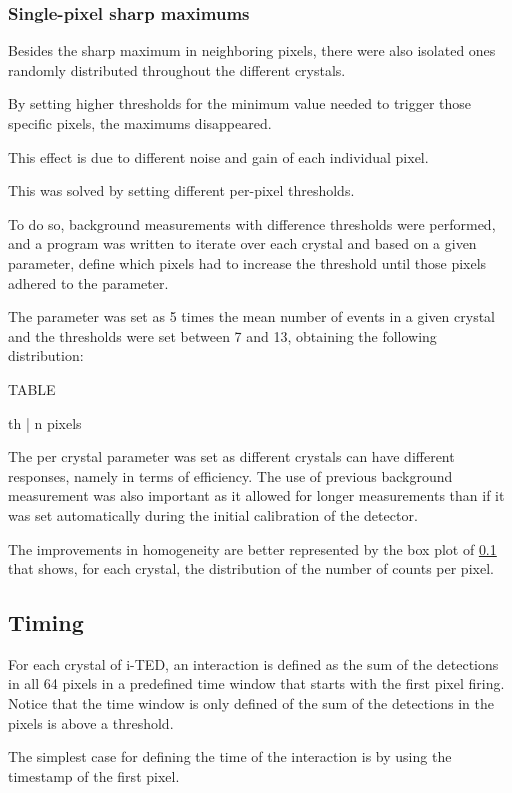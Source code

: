 \subsubsection{Single-pixel sharp maximums}

Besides the sharp maximum in neighboring pixels, there were also isolated ones randomly distributed throughout the different crystals.

By setting higher thresholds for the minimum value needed to trigger those specific pixels, the maximums disappeared.

This effect is due to different noise and gain of each individual pixel.

This was solved by setting different per-pixel thresholds.

To do so, background measurements with difference thresholds were performed, and a program was written to iterate over each crystal and based on a given parameter, define which pixels had to increase the threshold until those pixels adhered to the parameter.

The parameter was set as 5 times the mean number of events in a given crystal and the thresholds were set between 7 and 13, obtaining the following distribution:

TABLE

th | n pixels

The per crystal parameter was set as different crystals can have different responses, namely in terms of efficiency. The use of previous background measurement was also important as it allowed for longer measurements than if it was set automatically during the initial calibration of the detector.

The improvements in homogeneity are better represented by the box plot of \ref{} that shows, for each crystal, the distribution of the number of counts per pixel.

\subsection{Timing}

For each crystal of \ac{i-TED}, an interaction is defined as the sum of the detections in all 64 pixels in a predefined time window that starts with the first pixel firing. Notice that the time window is only defined of the sum of the detections in the pixels is above a threshold.

The simplest case for defining the time of the interaction is by using the timestamp of the first pixel.

